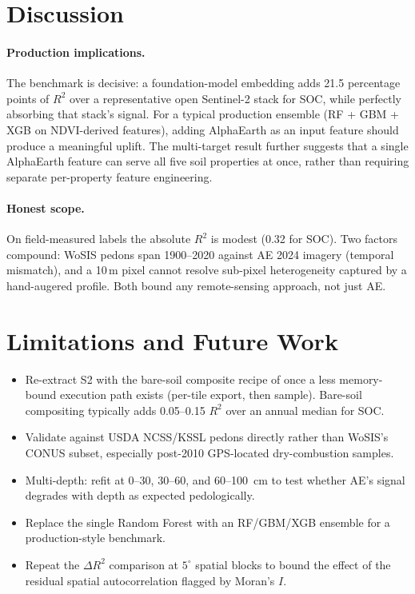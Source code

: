\documentclass[11pt]{article}
\begin{document}
\section{Discussion}

\paragraph{Production implications.}
The benchmark is decisive: a foundation-model embedding adds 21.5
percentage points of $R^2$ over a representative open Sentinel-2 stack
for SOC, while perfectly absorbing that stack's signal. For a typical
production ensemble (RF + GBM + XGB on NDVI-derived features), adding
AlphaEarth as an input feature should produce a meaningful uplift. The
multi-target result further suggests that a single AlphaEarth feature can
serve all five soil properties at once, rather than requiring separate
per-property feature engineering.

\paragraph{Honest scope.} On field-measured labels the absolute $R^2$ is
modest (0.32 for SOC). Two factors compound: WoSIS pedons span
1900--2020 against AE 2024 imagery (temporal mismatch), and a 10\,m
pixel cannot resolve sub-pixel heterogeneity captured by a hand-augered
profile. Both bound any remote-sensing approach, not just AE.

\section{Limitations and Future Work}
\begin{itemize}
\item Re-extract S2 with the bare-soil composite recipe of
\cite{safanelli2020bsc} once a less memory-bound execution path
exists (per-tile export, then sample). Bare-soil compositing typically
adds 0.05--0.15 $R^2$ over an annual median for SOC.
\item Validate against USDA NCSS/KSSL pedons directly rather than
WoSIS's CONUS subset, especially post-2010 GPS-located dry-combustion
samples.
\item Multi-depth: refit at 0--30, 30--60, and 60--100~cm to test
whether AE's signal degrades with depth as expected pedologically.
\item Replace the single Random Forest with an
RF/GBM/XGB ensemble for a production-style benchmark.
\item Repeat the $\Delta R^2$ comparison at $5^\circ$ spatial blocks to
bound the effect of the residual spatial autocorrelation flagged by
Moran's $I$.
\end{itemize}



\end{document}
